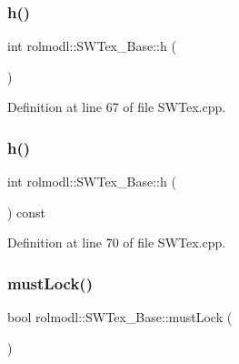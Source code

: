 \subsubsection{\texorpdfstring{h()}{h()}\hspace{0.1cm}{\footnotesize\ttfamily [1/2]}}
{\footnotesize\ttfamily int rolmodl\+::\+S\+W\+Tex\+\_\+\+Base\+::h (\begin{DoxyParamCaption}{ }\end{DoxyParamCaption})\hspace{0.3cm}{\ttfamily [noexcept]}}



Definition at line 67 of file S\+W\+Tex.\+cpp.

\mbox{\label{classrolmodl_1_1_s_w_tex___base_a84ceb6896b2428fc673786c2f6b69b8f}} 
\subsubsection{\texorpdfstring{h()}{h()}\hspace{0.1cm}{\footnotesize\ttfamily [2/2]}}
{\footnotesize\ttfamily int rolmodl\+::\+S\+W\+Tex\+\_\+\+Base\+::h (\begin{DoxyParamCaption}{ }\end{DoxyParamCaption}) const\hspace{0.3cm}{\ttfamily [noexcept]}}



Definition at line 70 of file S\+W\+Tex.\+cpp.

\mbox{\label{classrolmodl_1_1_s_w_tex___base_a689ae688bc8227f8c49812f66d9a43ae}} 
\subsubsection{\texorpdfstring{mustLock()}{mustLock()}\hspace{0.1cm}{\footnotesize\ttfamily [1/2]}}
{\footnotesize\ttfamily bool rolmodl\+::\+S\+W\+Tex\+\_\+\+Base\+::must\+Lock (\begin{DoxyParamCaption}{ }\end{DoxyParamCaption})\hspace{0.3cm}{\ttfamily [noexcept]}}



